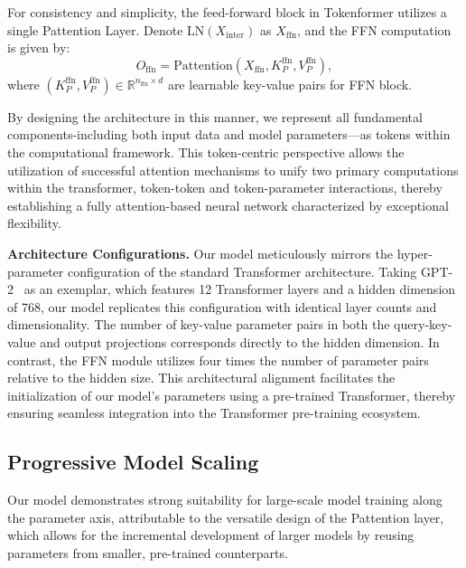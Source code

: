 \documentclass{article} %
\newcommand{\ourmethod}{Tokenformer\xspace}
\begin{document}
For consistency and simplicity, the feed-forward block in {\ourmethod} utilizes a single Pattention Layer. Denote $\text{LN}(X_{\text{inter}})$ as $X_{\text{ffn}}$, and the FFN computation is given by:
\begin{equation}
    O_{\text{ffn}} = \text{Pattention}\left(X_{\text{ffn}}, K_P^{\text{ffn}}, V_P^{\text{ffn}}\right),
    \label{eq:our_ffn}
\end{equation}
where $(K_P^{\text{ffn}}, V_P^{\text{ffn}}) \in \mathbb{R}^{n_{\text{ffn}}\times d}$ are learnable key-value pairs for FFN block. 

By designing the architecture in this manner, we represent all fundamental components-including both input data and model parameters—as tokens within the computational framework. This token-centric perspective allows the utilization of successful attention mechanisms to unify two primary computations within the transformer, token-token and token-parameter interactions, thereby establishing a fully attention-based neural network characterized by exceptional flexibility.

\textbf{Architecture Configurations.} Our model meticulously mirrors the hyper-parameter configuration of the standard Transformer architecture. Taking GPT-2~\citep{radford2018improving} as an exemplar, which features 12 Transformer layers and a hidden dimension of 768, our model replicates this configuration with identical layer counts and dimensionality. The number of key-value parameter pairs in both the query-key-value and output projections corresponds directly to the hidden dimension. In contrast, the FFN module utilizes four times the number of parameter pairs relative to the hidden size. This architectural alignment facilitates the initialization of our model's parameters using a pre-trained Transformer, thereby ensuring seamless integration into the Transformer pre-training ecosystem.

\subsection{Progressive Model Scaling} \label{sec:whytokenformer}
Our model demonstrates strong suitability for large-scale model training along the parameter axis, attributable to the versatile design of the Pattention layer, which allows for the incremental development of larger models by reusing parameters from smaller, pre-trained counterparts. 
\end{document}
